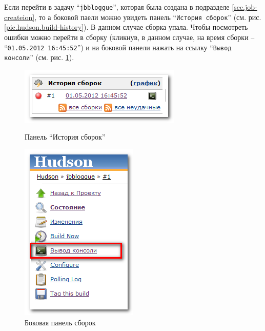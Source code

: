 \documentclass[a4paper,12pt]{article}
\begin{document}
Если перейти в задачу ``\texttt{jbbloggue}'', которая была создана в подразделе \ref{sec.job-createion}, то а боковой
паели можно увидеть панель ``\texttt{История сборок}'' (см. рис. \ref{pic.hudson.build-history}). В данном случае сборка
упала. Чтобы посмотреть ошибки можно перейти в сборку (кликнув, в данном случае, на время сборки  --
``\texttt{01.05.2012 16:45:52}'') и на боковой панели нажать на ссылку ``\texttt{Вывод консоли}'' (см. рис.
\ref{pic.hudson.build-sidebar}).

\begin{figure}[htp]
	\begin{minipage}[h]{0.49\linewidth}
		\begin{center}
			  \includegraphics[scale = 0.8]{job-2.png}
			  \vspace{-15pt}
			  \caption{Панель ``История сборок''}
			  \label{pic.hudson.build-history}
		\end{center}
	\end{minipage}
	\hfill
	\begin{minipage}[h]{0.49\linewidth}
		\begin{center}
		  \includegraphics[scale = 0.8]{job-3.png}
		  \vspace{-15pt}
		  \caption[labelInTOC]{Боковая панель сборок}
		  \label{pic.hudson.build-sidebar}
		\end{center}
	\end{minipage}
\end{figure}
\end{document}
